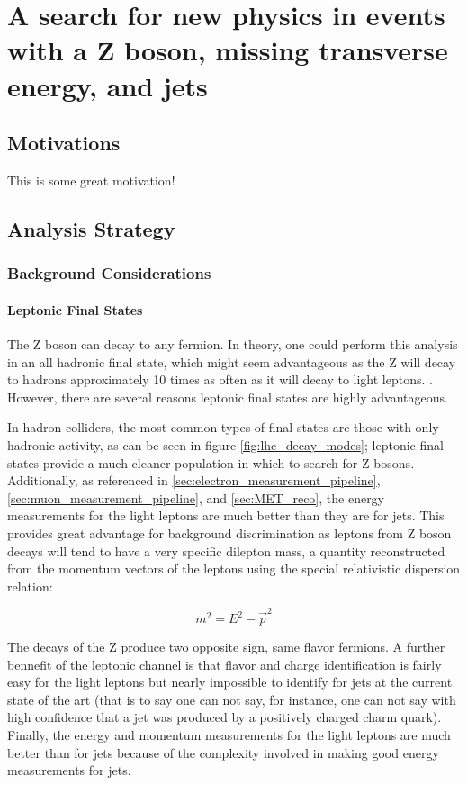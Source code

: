 \chapter{A search for new physics in events with a Z boson, missing transverse energy, and jets}

\section{Motivations}

This is some great motivation!

\section{Analysis Strategy}

\subsection{Background Considerations}

\subsubsection{Leptonic Final States}
The Z boson can decay to any fermion. In theory, one could perform this analysis in an all hadronic final state, which might seem advantageous as the Z will decay to hadrons approximately 10 times as often as it will decay to light leptons. . However, there are several reasons leptonic final states are highly advantageous.

In hadron colliders, the most common types of final states are those with only hadronic activity, as can be seen in figure \ref{fig:lhc_decay_modes}; leptonic final states provide a much cleaner population in which to search for Z bosons. Additionally, as referenced in \ref{sec:electron_measurement_pipeline}, \ref{sec:muon_measurement_pipeline}, and \ref{sec:MET_reco}, the energy measurements for the light leptons are much better than they are for jets. This provides great advantage for background discrimination as leptons from Z boson decays will tend to have a very specific dilepton mass, a quantity reconstructed from the momentum vectors of the leptons using the special relativistic dispersion relation:

\[
m^2 = E^2 - \vec{p}^2
\]

The decays of the Z produce two opposite sign, same flavor fermions. A further bennefit of the leptonic channel is that flavor and charge identification is fairly easy for the light leptons but nearly impossible to identify for jets at the current state of the art (that is to say one can not say, for instance, one can not say with high confidence that a jet was produced by a positively charged charm quark). Finally, the energy and momentum measurements for the light leptons are much better than for jets because of the complexity involved in making good energy measurements for jets.  

